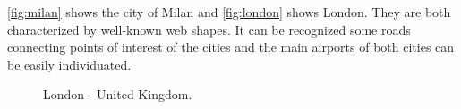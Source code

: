 \autoref{fig:milan} shows the city of Milan and \autoref{fig:london} shows London. They are both characterized by well-known web shapes. It can be recognized some roads connecting points of interest of the cities and the main airports of both cities can be easily individuated.
\begin{figure}[h!]
    \hspace*{-2.8cm}
    \centering
    \caption{London - United Kingdom.}%
    \label{fig:london}
\end{figure}

